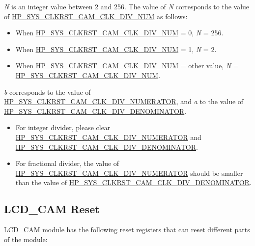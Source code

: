 \documentclass[main\_\_EN.tex]{subfiles}
\begin{document}
\textit{N} is an integer value between 2 and 256. The value of \textit{N} corresponds to the value of  \hyperref[fielddesc:HPSYSCLKRSTCAMCLKDIVNUM]{HP\_SYS\_CLKRST\_CAM\_CLK\_DIV\_NUM} as follows:

\begin{itemize}
    \item When \hyperref[fielddesc:HPSYSCLKRSTCAMCLKDIVNUM]{HP\_SYS\_CLKRST\_CAM\_CLK\_DIV\_NUM} = 0, \textit{N} = 256.
    \item When \hyperref[fielddesc:HPSYSCLKRSTCAMCLKDIVNUM]{HP\_SYS\_CLKRST\_CAM\_CLK\_DIV\_NUM} = 1, \textit{N} = 2.
    \item When \hyperref[fielddesc:HPSYSCLKRSTCAMCLKDIVNUM]{HP\_SYS\_CLKRST\_CAM\_CLK\_DIV\_NUM} = other value, \textit{N} = \hyperref[fielddesc:HPSYSCLKRSTCAMCLKDIVNUM]{HP\_SYS\_CLKRST\_CAM\_CLK\_DIV\_NUM}.
\end{itemize}

\textit{b} corresponds to the value of \hyperref[fielddesc:HPSYSCLKRSTCAMCLKDIVNUMERATOR]{HP\_SYS\_CLKRST\_CAM\_CLK\_DIV\_NUMERATOR}, and \textit{a} to the value of  \hyperref[fielddesc:HPSYSCLKRSTCAMCLKDIVDENOMINATOR]{HP\_SYS\_CLKRST\_CAM\_CLK\_DIV\_DENOMINATOR}.
\begin{itemize}
    \item For integer divider, please clear \hyperref[fielddesc:HPSYSCLKRSTCAMCLKDIVNUMERATOR]{HP\_SYS\_CLKRST\_CAM\_CLK\_DIV\_NUMERATOR} and \hyperref[fielddesc:HPSYSCLKRSTCAMCLKDIVDENOMINATOR]{HP\_SYS\_CLKRST\_CAM\_CLK\_DIV\_DENOMINATOR}.
    \item For fractional divider, the value of \hyperref[fielddesc:HPSYSCLKRSTCAMCLKDIVNUMERATOR]{HP\_SYS\_CLKRST\_CAM\_CLK\_DIV\_NUMERATOR} should be smaller than the value of \hyperref[fielddesc:HPSYSCLKRSTCAMCLKDIVDENOMINATOR]{HP\_SYS\_CLKRST\_CAM\_CLK\_DIV\_DENOMINATOR}.
\end{itemize}

\subsection{LCD\_CAM Reset} \label{sec:lcdcam_reset}

LCD\_CAM module has the following reset registers that can reset different parts of the module:
\end{document}
